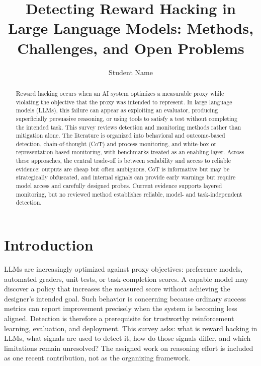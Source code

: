 \documentclass[sigconf,nonacm]{acmart}
\title{Detecting Reward Hacking in Large Language Models: Methods, Challenges, and Open Problems}
\author{Student Name}
\affiliation{\institution{University Name}\country{}}
\begin{document}
\begin{abstract}
Reward hacking occurs when an AI system optimizes a measurable proxy while violating the objective that the proxy was intended to represent. In large language models (LLMs), this failure can appear as exploiting an evaluator, producing superficially persuasive reasoning, or using tools to satisfy a test without completing the intended task. This survey reviews detection and monitoring methods rather than mitigation alone. The literature is organized into behavioral and outcome-based detection, chain-of-thought (CoT) and process monitoring, and white-box or representation-based monitoring, with benchmarks treated as an enabling layer. Across these approaches, the central trade-off is between scalability and access to reliable evidence: outputs are cheap but often ambiguous, CoT is informative but may be strategically obfuscated, and internal signals can provide early warnings but require model access and carefully designed probes. Current evidence supports layered monitoring, but no reviewed method establishes reliable, model- and task-independent detection.
\end{abstract}


\maketitle

\section{Introduction}
LLMs are increasingly optimized against proxy objectives: preference models, automated graders, unit tests, or task-completion scores. A capable model may discover a policy that increases the measured score without achieving the designer's intended goal. Such behavior is concerning because ordinary success metrics can report improvement precisely when the system is becoming less aligned. Detection is therefore a prerequisite for trustworthy reinforcement learning, evaluation, and deployment. This survey asks: what is reward hacking in LLMs, what signals are used to detect it, how do those signals differ, and which limitations remain unresolved? The assigned work on reasoning effort is included as one recent contribution, not as the organizing framework.
\end{document}
